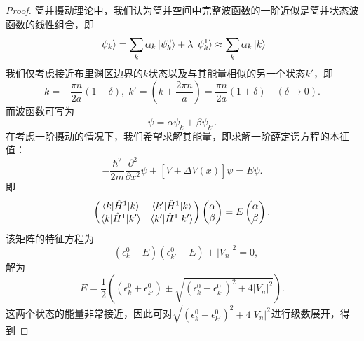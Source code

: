 \begin{proof}\small
    简并摄动理论中，我们认为简并空间中完整波函数的一阶近似是简并状态波函数的线性组合，即
    \begin{equation}
        \ket{\psi_k} = \sum_{k} \alpha_k \ket{\psi_k^0} + \lambda \ket{\psi_k^1} \approx \sum_k \alpha_k \ket{k}
    \end{equation}
    我们仅考虑接近布里渊区边界的$k$状态以及与其能量相似的另一个状态$k'$，即
    \begin{equation}
        k = - \frac{\pi n}{2 a} (1 - \delta), \; k' = (k + \frac{2\pi n}{a}) = \frac{\pi n}{2a}(1 + \delta) \quad (\delta \to 0).
    \end{equation}
    而波函数可写为
    \begin{equation}
        \psi = \alpha \psi_k + \beta \psi_{k'}.
    \end{equation}
    在考虑一阶摄动的情况下，我们希望求解其能量，即求解一阶薛定谔方程的本征值：
    \begin{equation}
        - \frac{\hbar^2}{2m} \frac{\partial^2}{\partial x^2} \psi + [\overline V + \Delta V(x)] \psi = E \psi.
    \end{equation}
    即
    \begin{equation}
        \begin{pmatrix}
            \braket{k|\hat H^1|k} & \braket{k'|\hat H^1|k} \\
            \braket{k|\hat H^1|k'} & \braket{k'|\hat H^1|k'} \\
        \end{pmatrix}
        \begin{pmatrix}
            \alpha \\ \beta
        \end{pmatrix} = E \begin{pmatrix}
            \alpha \\ \beta
        \end{pmatrix}.
    \end{equation}
    该矩阵的特征方程为
    \begin{equation}
        - (\epsilon_k^0 - E)(\epsilon_{k'}^0 - E) + |V_n|^2 = 0,
    \end{equation}
    解为
    \begin{equation}
        E = \frac{1}{2} \left( (\epsilon_k^0 + \epsilon_{k'}^0) \pm \sqrt{(\epsilon_{k}^0 - \epsilon_{k'}^0)^2 + 4 |V_n|^2} \right).
    \end{equation}
    这两个状态的能量非常接近，因此可对$\sqrt{(\epsilon_{k}^0 - \epsilon_{k'}^0)^2 + 4 |V_n|^2}$进行级数展开，得到

\end{proof}
